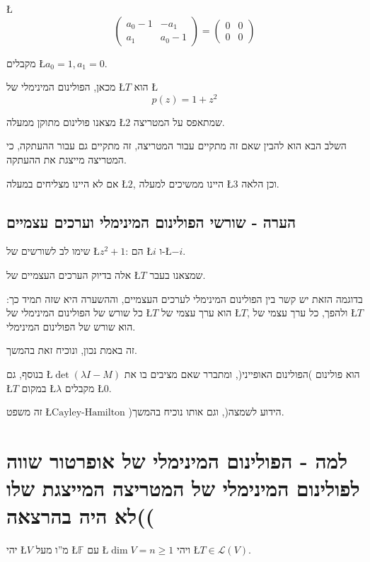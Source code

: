 \documentclass[english,hebrew]{article}
\begin{document}
\L{%
\[
\begin{pmatrix}a_{0}-1 & -a_{1}\\
a_{1} & a_{0}-1
\end{pmatrix}=\begin{pmatrix}0 & 0\\
0 & 0
\end{pmatrix}
\]
}%

מקבלים \L{$a_{0}=1,a_{1}=0$}.

מכאן, הפולינום המינימלי של \L{$T$} הוא \L{%
\[
p(z)=1+z^{2}
\]
}%

מצאנו פולינום מתוקן ממעלה \L{$2$} שמתאפס על המטריצה.

השלב הבא הוא להבין שאם זה מתקיים עבור המטריצה, זה מתקיים גם עבור ההעתקה,
כי המטריצה מייצגת את ההעתקה.

אם לא היינו מצליחים במעלה \L{$2$}, היינו ממשיכים למעלה \L{$3$} וכן
הלאה.

\subsection{הערה - שורשי הפולינום המינימלי וערכים עצמיים}

שימו לב לשורשים של \L{$z^{2}+1$}: הם \L{$i$} ו-\L{$-i$}.

אלה בדיוק הערכים העצמיים של \L{$T$} שמצאנו בעבר.

בדוגמה הזאת יש קשר בין הפולינום המינימלי לערכים העצמיים, וההשערה היא
שזה תמיד כך: כל שורש של הפולינום המינימלי של \L{$T$} הוא ערך עצמי
של \L{$T$}, ולהפך, כל ערך עצמי של \L{$T$} הוא שורש של הפולינום המינימלי.

זה באמת נכון, ונוכיח זאת בהמשך.

בנוסף, גם \L{$\det\left(\lambda I-M\right)$} הוא פולינום )הפולינום
האופייני(, ומתברר שאם מציבים בו את \L{$T$} במקום \L{$\lambda$} מקבלים
\L{$0$}.

זה משפט \L{$\text{Cayley-Hamilton}$} )הידוע לשמצה(, וגם אותו נוכיח
בהמשך.

\section{למה - הפולינום המינימלי של אופרטור שווה לפולינום המינימלי של המטריצה
המייצגת שלו )לא היה בהרצאה(}

יהי \L{$V$} מ\textquotedblright ו מעל \L{$\mathbb{F}$} עם \L{$\dim V=n\geq1$}
ויהי \L{$T\in\mathcal{L}\left(V\right)$}.
\end{document}

